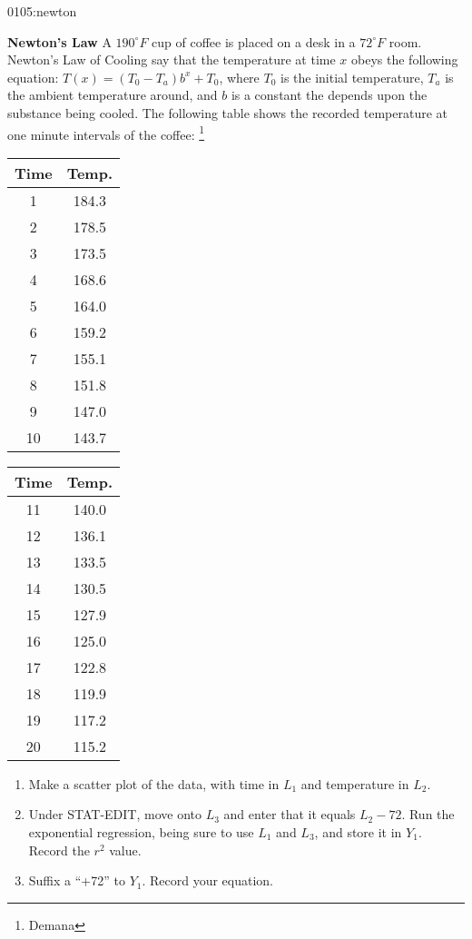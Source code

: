 \begin{defproblem}{0105:newton}
\begin{onlyproblem}
\textbf{Newton's Law}
A $190^\circ F$ cup of coffee is placed on a desk in a $72^\circ F$ room.
Newton's Law of Cooling say that the temperature at time $x$ obeys the
following equation: $T(x) = (T_0-T_a)b^x+T_0$, where $T_0$ is the
initial temperature, $T_a$ is the ambient temperature around, and $b$ is 
a constant the depends upon the substance being cooled.  The following
table shows the recorded temperature at one minute intervals of the coffee:
\footnote{Demana}

\begin{tabular}{c|c}
	\textbf{Time} & \textbf{Temp.} \\ \hline
	1 & 184.3 \\
	2 & 178.5 \\
	3 & 173.5 \\
	4 & 168.6 \\
	5 & 164.0 \\
	6 & 159.2 \\
	7 & 155.1 \\
	8 & 151.8\\
	9 & 147.0\\
	10 & 143.7\\
\end{tabular}
\begin{tabular}{c|c}
	\textbf{Time} & \textbf{Temp.} \\ \hline
	11 & 140.0\\
	12 & 136.1 \\
	13 & 133.5 \\
	14 & 130.5\\
	15 & 127.9 \\
	16 & 125.0\\
	17 & 122.8\\
	18 & 119.9\\
	19 & 117.2\\
	20 & 115.2\\
\end{tabular}
\begin{enumerate}
\item Make a scatter plot of the data, with time in $L_1$ and temperature
in $L_2$.
\item Under STAT-EDIT, move onto $L_3$ and enter that it equals $L_2-72$.  Run the exponential regression, being sure to use $L_1$ and $L_3$, and store it in $Y_1$.  Record the $r^2$ value.
\item Suffix a ``+72'' to $Y_1$.  Record your equation.  

\end{enumerate}
\end{onlyproblem}
\end{defproblem}
